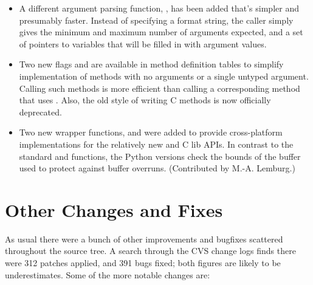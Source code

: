 \documentclass{howto}
\begin{document}
\begin{itemize}
  \item A different argument parsing function,
  , has been added that's simpler and
  presumably faster.  Instead of specifying a format string, the
  caller simply gives the minimum and maximum number of arguments
  expected, and a set of pointers to  variables that
  will be filled in with argument values.  

  \item Two new flags  and  are
   available in method definition tables to simplify implementation of
   methods with no arguments or a single untyped argument. Calling
   such methods is more efficient than calling a corresponding method
   that uses . 
   Also, the old  style of writing C methods is 
   now officially deprecated.  

\item
   Two new wrapper functions,  and
    were added to provide 
   cross-platform implementations for the relatively new
    and  C lib APIs. In
   contrast to the standard  and
    functions, the Python versions check the
   bounds of the buffer used to protect against buffer overruns.
   (Contributed by M.-A. Lemburg.)

\end{itemize}


\section{Other Changes and Fixes}

As usual there were a bunch of other improvements and bugfixes
scattered throughout the source tree.  A search through the CVS change
logs finds there were 312 patches applied, and 391 bugs fixed; both
figures are likely to be underestimates.  Some of the more notable
changes are:
\end{document}
